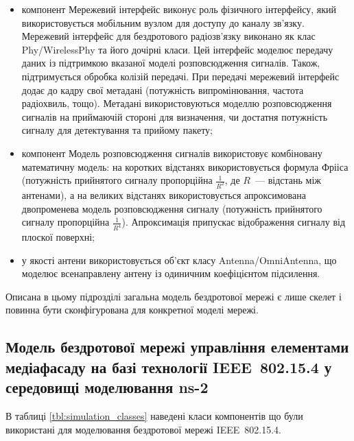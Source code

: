 \documentclass[a4paper,ukrainian,utf8,nocolumnsxix,floatsection,equationsection]{eskdtext}
\newcommand{\iee}[0]{IEEE~802.15.4\xspace}
\begin{document}
\begin{itemize}
	\item компонент Мережевий інтерфейс виконує роль фізичного інтерфейсу, який використовується мобільним вузлом для доступу до каналу зв'язку. Мережевий інтерфейс для бездротового радіозв'язку виконано як клас Phy/WirelessPhy та його дочірні класи. Цей інтерфейс моделює передачу даних із підтримкою вказаної моделі розповсюдження сигналів. Також, підтримується обробка колізій передачі. При передачі мережевий інтерфейс додає до кадру свої метадані (потужність випромінювання, частота радіохвиль, тощо). Метадані використовуються моделлю розповсюдження сигналів на приймаючій стороні для визначення, чи достатня потужність сигналу для детектування та прийому пакету;

	\item компонент Модель розповсюдження сигналів використовує комбіновану математичну модель: на коротких відстанях використовується формула Фрііса (потужність прийнятого сигналу пропорційна $\frac{1}{R^2}$, де $R$~--- відстань між антенами), а на великих відстанях використовується апроксимована двопроменева модель розповсюдження сигналу (потужність прийнятого сигналу пропорційна $\frac{1}{R^4}$). Апроксимація припускає відображення сигналу від плоскої поверхні;

	\item у якості антени використовується об'єкт класу Antenna/OmniAntenna, що моделює всенаправлену антену із одиничним коефіцієнтом підсилення. 
\end{itemize}

Описана в цьому підрозділі загальна модель бездротової мережі є лише скелет і повинна бути сконфігурована для конкретної моделі мережі.

\subsection{Модель бездротової мережі управління елементами медіафасаду на базі технології \iee у середовищі моделювання ns-2}
\label{sub:ns:ieee:network:model}

В таблиці \ref{tbl:simulation_classes} наведені класи компонентів що були використані для моделювання бездротової мережі \iee.
\end{document}
